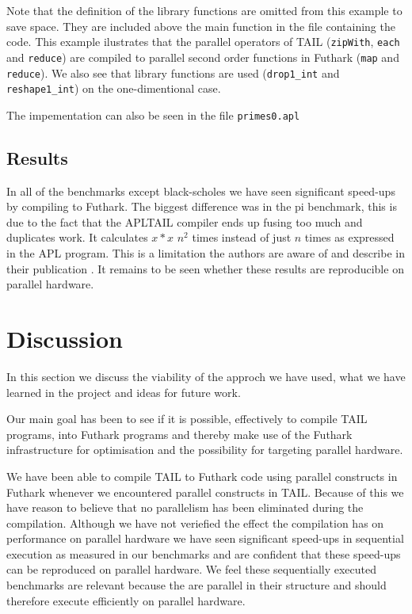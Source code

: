 \documentclass[11pt]{article}
\begin{document}
Note that the definition of the library functions are omitted from this example to save space. They are included above the main function in the file containing the code. 
This example ilustrates that the parallel operators of TAIL ({\tt zipWith}, {\tt each} and {\tt reduce}) are compiled to parallel  second order functions in Futhark ({\tt map} and {\tt reduce}). 
We also see that library functions are used ({\tt drop1\_int} and {\tt reshape1\_int}) on the one-dimentional case.

The impementation can also be seen in the file {\tt primes0.apl}\\
\subsection{Results}

In all of the benchmarks except black-scholes we have seen significant speed-ups by compiling to Futhark.
The biggest difference was in the pi benchmark, this is due to the fact that the APLTAIL compiler ends up fusing too much and
duplicates work. It calculates $x * x$ $n^2$ times instead of just $n$ times as expressed in the APL program.
This is a limitation the authors are aware of and describe in their publication \cite{Array:2015}.
It remains to be seen whether these results are reproducible on parallel hardware.

\section{Discussion}
\label{sec:discussion}
In this section we discuss the viability of the approch we have used, what we have learned in the project and ideas for future work. 

Our main goal has been to see if it is possible, effectively to compile TAIL programs, into Futhark programs and thereby make use of the Futhark infrastructure for optimisation and the possibility for targeting parallel hardware.

We have been able to compile TAIL to Futhark code using parallel constructs in Futhark whenever we encountered parallel constructs in TAIL.
Because of this we have reason to believe that no parallelism has been eliminated during the compilation.
Although we have not veriefied the effect the compilation has on performance on parallel hardware we have seen significant speed-ups
in sequential execution as measured in our benchmarks and are confident that these speed-ups can be reproduced on parallel hardware.
We feel these sequentially executed benchmarks are relevant because the are parallel in their structure and should therefore execute efficiently on parallel
 hardware.
 
\end{document}
